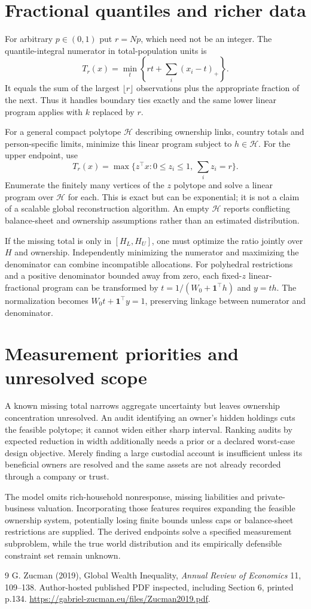 \documentclass[11pt]{article}
\begin{document}
\section*{Fractional quantiles and richer data}
For arbitrary $p\in(0,1)$ put $r=Np$, which need not be an integer. The quantile-integral numerator in total-population units is
\[
 T_r(x)=\min_t\left\{rt+\sum_i(x_i-t)_+\right\}.
\]
It equals the sum of the largest $\lfloor r\rfloor$ observations plus the appropriate fraction of the next. Thus it handles boundary ties exactly and the same lower linear program applies with $k$ replaced by $r$.

For a general compact polytope $\mathcal H$ describing ownership links, country totals and person-specific limits, minimize this linear program subject to $h\in\mathcal H$. For the upper endpoint, use
\[
 T_r(x)=\max\{z^\top x:0\leq z_i\leq1,\ \sum_i z_i=r\}.
\]
Enumerate the finitely many vertices of the $z$ polytope and solve a linear program over $\mathcal H$ for each. This is exact but can be exponential; it is not a claim of a scalable global reconstruction algorithm. An empty $\mathcal H$ reports conflicting balance-sheet and ownership assumptions rather than an estimated distribution.

If the missing total is only in $[H_L,H_U]$, one must optimize the ratio jointly over $H$ and ownership. Independently minimizing the numerator and maximizing the denominator can combine incompatible allocations. For polyhedral restrictions and a positive denominator bounded away from zero, each fixed-$z$ linear-fractional program can be transformed by $t=1/(W_0+\mathbf1^\top h)$ and $y=th$. The normalization becomes $W_0t+\mathbf1^\top y=1$, preserving linkage between numerator and denominator.

\section*{Measurement priorities and unresolved scope}
A known missing total narrows aggregate uncertainty but leaves ownership concentration unresolved. An audit identifying an owner's hidden holdings cuts the feasible polytope; it cannot widen either sharp interval. Ranking audits by expected reduction in width additionally needs a prior or a declared worst-case design objective. Merely finding a large custodial account is insufficient unless its beneficial owners are resolved and the same assets are not already recorded through a company or trust.

The model omits rich-household nonresponse, missing liabilities and private-business valuation. Incorporating those features requires expanding the feasible ownership system, potentially losing finite bounds unless caps or balance-sheet restrictions are supplied. The derived endpoints solve a specified measurement subproblem, while the true world distribution and its empirically defensible constraint set remain unknown.
\begin{thebibliography}{9}
 G. Zucman (2019), Global Wealth Inequality, \emph{Annual Review of Economics} 11, 109--138. Author-hosted published PDF inspected, including Section 6, printed p.134. \url{https://gabriel-zucman.eu/files/Zucman2019.pdf}.
\end{thebibliography}
\end{document}
